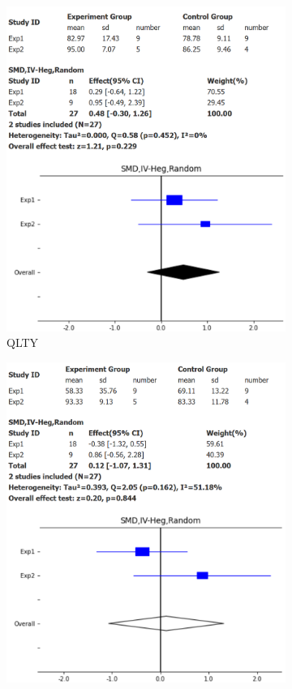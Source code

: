 \begin{figure}[H]
    \begin{subfigure}{0.5\textwidth}
        \includegraphics[width=\linewidth]{figures/forest_plots/QLTY.png}
        \caption{QLTY}
        \label{fp_qlty}
    \end{subfigure}\hfil
    \begin{subfigure}{0.5\textwidth}
        \includegraphics[width=\linewidth]{figures/forest_plots/PROD.png}

\end{subfigure}
\end{figure}

